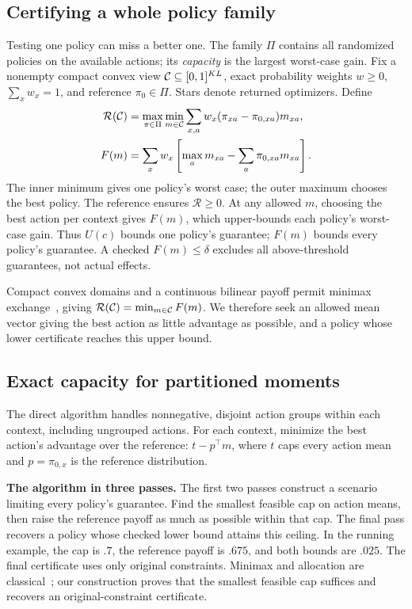 \subsection{Certifying a whole policy family}\label{sec:family-capacity}
Testing one policy can miss a better one. The family $\Pi$ contains all randomized policies on the available actions; its \emph{capacity} is the largest worst-case gain. Fix a nonempty compact convex view $\mathcal{C}\subseteq[0,1]^{KL}$, exact probability weights $w\ge0$, $\sum_xw_x=1$, and reference $\pi_0\in\Pi$. Stars denote returned optimizers. Define
\begin{align}
 \mathcal R(\mathcal{C})&=\max_{\pi\in\Pi}\min_{m\in\mathcal{C}}
   \sum_{x,a}w_x(\pi_{xa}-\pi_{0,xa})m_{xa},\label{eq:capacity}\\
 F(m)&=\sum_xw_x\left[\max_a m_{xa}
             -\sum_a\pi_{0,xa}m_{xa}\right].\label{eq:family-upper}
\end{align}
The inner minimum gives one policy's worst case; the outer maximum chooses the best policy. The reference ensures $\mathcal R\ge0$. At any allowed $m$, choosing the best action per context gives $F(m)$, which upper-bounds each policy's worst-case gain. Thus $U(c)$ bounds one policy's guarantee; $F(m)$ bounds every policy's guarantee. A checked $F(m)\le\delta$ excludes all above-threshold guarantees, not actual effects.

Compact convex domains and a continuous bilinear payoff permit minimax exchange~\cite{Sion1958Minimax}, giving $\mathcal R(\mathcal{C})=\min_{m\in\mathcal{C}}F(m)$. We therefore seek an allowed mean vector giving the best action as little advantage as possible, and a policy whose lower certificate reaches this upper bound.

\subsection{Exact capacity for partitioned moments}\label{sec:partition-capacity}
The direct algorithm handles nonnegative, disjoint action groups within each context, including ungrouped actions. For each context, minimize the best action's advantage over the reference: $t-p^\top m$, where $t$ caps every action mean and $p=\pi_{0,x}$ is the reference distribution.

\begin{samepage}
\textbf{The algorithm in three passes.} The first two passes construct a scenario limiting every policy's guarantee. Find the smallest feasible cap on action means, then raise the reference payoff as much as possible within that cap. The final pass recovers a policy whose checked lower bound attains this ceiling. In the running example, the cap is $.7$, the reference payoff is $.675$, and both bounds are $.025$. The final certificate uses only original constraints. Minimax and allocation are classical~\cite{Eiselt1986ContinuousGLB,Kuno1991ContinuousKnapsack}; our construction proves that the smallest feasible cap suffices and recovers an original-constraint certificate.

\end{samepage}

